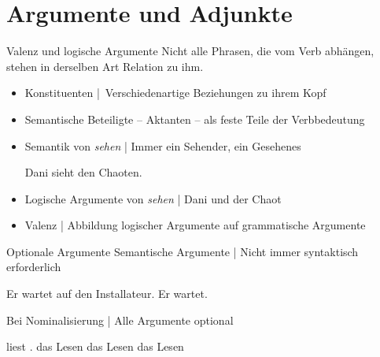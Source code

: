 \section{Argumente und Adjunkte}

\begin{frame}
  {Valenz und logische Argumente}
  \onslide<+->
  \onslide<+->
  Nicht alle Phrasen, die vom Verb abhängen, stehen in derselben Art Relation zu ihm.\\
  \Zeile
  \begin{itemize}[<+->]
    \item Konstituenten | Verschiedenartige Beziehungen zu ihrem Kopf
    \item Semantische Beteiligte -- \alert{Aktanten} -- als \alert{feste Teile der Verbbedeutung}
    \item Semantik von \textit{sehen} | Immer ein \alert{Sehender}, ein \alert{Gesehenes}
      \Viertelzeile
      \begin{exe}
       \ex Dani sieht den Chaoten.
      \end{exe}
    \item \alert{Logische Argumente von \textit{sehen}} | Dani und der Chaot
    \item Valenz | Abbildung logischer Argumente auf grammatische Argumente
  \end{itemize}
\end{frame}

\begin{frame}
  {Optionale Argumente}
  \onslide<+->
  \onslide<+->
  Semantische Argumente | Nicht immer syntaktisch erforderlich\\
  \onslide<+->
  \Halbzeile
    \begin{exe}
      \ex Er wartet \alert{auf den Installateur}.
      \ex Er wartet.
    \end{exe}
  \onslide<+->
  \Zeile
  Bei \alert{Nominalisierung} | Alle Argumente optional\\
  \onslide<+->
  \Halbzeile
    \begin{exe}
      \ex {} \alert{liest} .
      \ex \alert{das Lesen}  
      \ex \alert{das Lesen}  
      \ex \alert{das Lesen} 
    \end{exe}
\end{frame}

